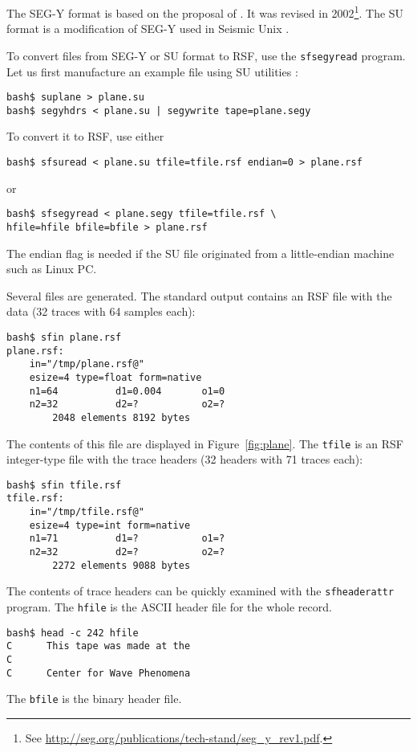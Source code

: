 The SEG-Y format is based on the proposal of \cite{GEO40-02-03440352}.
It was revised in 2002\footnote{See \url{http://seg.org/publications/tech-stand/seg_y_rev1.pdf}.}. The
SU format is a modification of SEG-Y used in Seismic Unix
\cite[]{TLE16-07-10451049}.

To convert files from SEG-Y or SU format to RSF, use the \texttt{sfsegyread}
program. Let us first manufacture an example file using SU utilities
\cite[]{su}:
\begin{verbatim}
bash$ suplane > plane.su
bash$ segyhdrs < plane.su | segywrite tape=plane.segy
\end{verbatim}
To convert it to RSF, use either
\begin{verbatim}
bash$ sfsuread < plane.su tfile=tfile.rsf endian=0 > plane.rsf
\end{verbatim}
or
\begin{verbatim}
bash$ sfsegyread < plane.segy tfile=tfile.rsf \
hfile=hfile bfile=bfile > plane.rsf
\end{verbatim}
The endian flag is needed if the SU file originated from a little-endian
machine such as Linux PC.

Several files are generated. The standard output contains an RSF file with the
data (32 traces with 64 samples each):
\begin{verbatim}
bash$ sfin plane.rsf
plane.rsf:
    in="/tmp/plane.rsf@"
    esize=4 type=float form=native
    n1=64          d1=0.004       o1=0
    n2=32          d2=?           o2=?
        2048 elements 8192 bytes
\end{verbatim}
The contents of this file are displayed in Figure~\ref{fig:plane}.
The \texttt{tfile} is an RSF integer-type file with the trace headers (32
headers with 71 traces each):
\begin{verbatim}
bash$ sfin tfile.rsf
tfile.rsf:
    in="/tmp/tfile.rsf@"
    esize=4 type=int form=native
    n1=71          d1=?           o1=?
    n2=32          d2=?           o2=?
        2272 elements 9088 bytes
\end{verbatim}
The contents of trace headers can be quickly examined with the 
\texttt{sfheaderattr} program.
The \texttt{hfile} is the ASCII header file for the whole record.
\begin{verbatim}
bash$ head -c 242 hfile
C      This tape was made at the
C                                                                              
C      Center for Wave Phenomena                         
\end{verbatim}
The  \texttt{bfile} is the binary header file.

